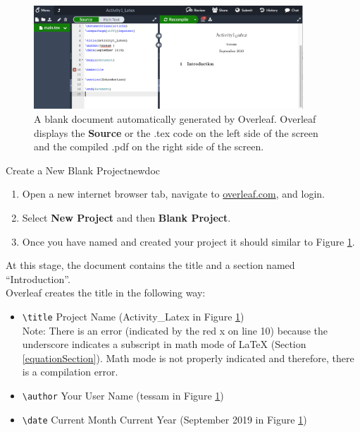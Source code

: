 \documentclass{article}
\begin{document}
\begin{figure}[h]
    \centering
    \includegraphics[width=0.9\textwidth]{blankDocument.png}
    \caption{A blank document automatically generated by Overleaf. Overleaf displays the \color{OliveGreen}\textbf{Source }\color{black} or the .tex code on the left side of the screen and the compiled .pdf on the right side of the screen.}
    \label{fig:blankDocument}
\end{figure}

\begin{center}
\begin{acta}{Create a New Blank Project}{newdoc}
\normalfont
\begin{enumerate}
    \item Open a new internet browser tab,  navigate to \url{overleaf.com}, and login. 
    \item Select \color{OliveGreen}\textbf{New Project}\color{black} and then \color{OliveGreen}\textbf{Blank Project}\color{black}.
    \item Once you have named and created your project it should similar to Figure \ref{fig:blankDocument}. \\
\end{enumerate}

At this stage, the document contains the title and a section named ``Introduction''.\\

Overleaf creates the title in the following way:
\begin{itemize}
    \item \verb!\title! Project Name (Activity\_Latex in Figure \ref{fig:blankDocument})\\
    Note: There is an error (indicated by the red x on line 10) because the underscore indicates a subscript in math mode of LaTeX (Section \ref{equationSection}). Math mode is not properly indicated and therefore, there is a compilation error. 
    \item \verb!\author! Your User Name (tessam in Figure \ref{fig:blankDocument})
    \item \verb!\date! Current Month Current Year (September 2019 in Figure \ref{fig:blankDocument})
\end{itemize}

\end{acta}
\end{center}
\end{document}
